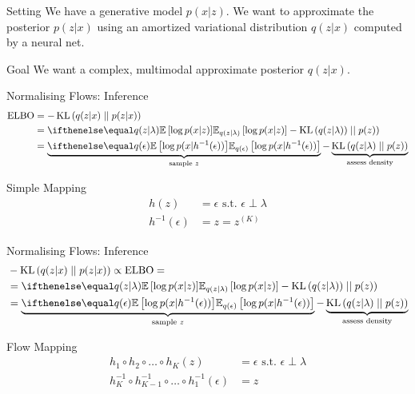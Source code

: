 \documentclass[14pt]{beamer}
\begin{document}
\begin{frame}{Setting}
We have a generative model $ p(x|z) $. We want to approximate the posterior $ p(z|x) $ using an amortized variational distribution $ q(z|x) $ computed by a neural net.
\pause
\begin{block}{Goal}
We want a complex, multimodal approximate posterior $ q(z|x) $.
\end{block}
\end{frame}

\begin{frame}{Normalising Flows: Inference}
\begin{equation*}
\begin{aligned}
\ELBO &= -\KL{q(z|x)}{p(z|x)} \\
&= \E[q(z|\lambda)]{\log p(x|z)} - \KL{q(z|\lambda))}{p(z)} \\
&= \underbrace{\E[q(\epsilon)]{\log p(x|h^{-1}(\epsilon))}}_{\text{sample $ z $}} - \underbrace{\KL{q(z|\lambda)}{p(z)}}_{\text{assess density}}
\end{aligned}
\end{equation*}
\begin{block}{Simple Mapping}
\begin{equation*}
\begin{aligned}
h(z) &= \epsilon \text{ s.t. } \epsilon \perp \lambda \\
h^{-1}(\epsilon) &= z = z^{(K)}
\end{aligned}
\end{equation*}
\end{block}
\end{frame}

\begin{frame}{Normalising Flows: Inference}
\begin{equation*}
\begin{aligned}
&-\KL{q(z|x)}{p(z|x)} \propto \ELBO = \\
&= \E[q(z|\lambda)]{\log p(x|z)} - \KL{q(z|\lambda))}{p(z)} \\
&= \underbrace{\E[q(\epsilon)]{\log p(x|h^{-1}(\epsilon))}}_{\text{sample $ z $}} - \underbrace{\KL{q(z|\lambda)}{p(z)}}_{\text{assess density}}
\end{aligned}
\end{equation*}
\begin{block}{Flow Mapping}
\begin{equation*}
\begin{aligned}
h_{1}\circ h_{2}\circ \ldots \circ h_{K}(z) &= \epsilon \text{ s.t. } \epsilon \perp \lambda \\
h^{-1}_{K}\circ h^{-1}_{K-1}\circ\ldots \circ h^{-1}_{1}(\epsilon) &= z
\end{aligned}
\end{equation*}
\end{block}
\end{frame}
\end{document}
